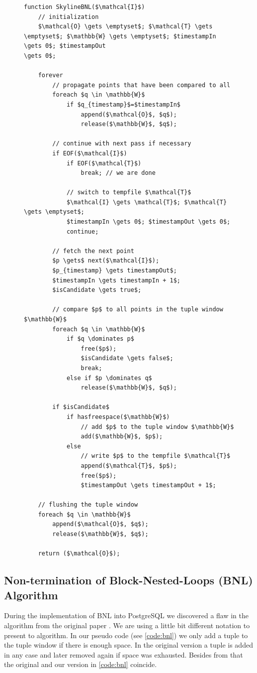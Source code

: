 \begin{figure}[htbp]
\begin{lstlisting}[language=pseudo,
caption={Fixed Block-Nested-Loops (BNL) Algorithm},
label={code:fixedbnl}
]
function SkylineBNL($\mathcal{I}$) 
	// initialization
	$\mathcal{O} \gets \emptyset$; $\mathcal{T} \gets \emptyset$; $\mathbb{W} \gets \emptyset$; $timestampIn \gets 0$; $timestampOut
\gets 0$;

	forever
		// propagate points that have been compared to all
		foreach $q \in \mathbb{W}$
			if $q_{timestamp}$=$timestampIn$
				append($\mathcal{O}$, $q$);
				release($\mathbb{W}$, $q$);

		// continue with next pass if necessary
		if EOF($\mathcal{I}$)
			if EOF($\mathcal{T}$)
				break; // we are done

			// switch to tempfile $\mathcal{T}$
			$\mathcal{I} \gets \mathcal{T}$; $\mathcal{T} \gets \emptyset$;
			$timestampIn \gets 0$; $timestampOut \gets 0$;
			continue;

		// fetch the next point
		$p \gets$ next($\mathcal{I}$);
		$p_{timestamp} \gets timestampOut$;
		$timestampIn \gets timestampIn + 1$;
		$isCandidate \gets true$;

		// compare $p$ to all points in the tuple window $\mathbb{W}$
		foreach $q \in \mathbb{W}$
			if $q \dominates p$
				free($p$);
				$isCandidate \gets false$;
				break;
			else if $p \dominates q$
				release($\mathbb{W}$, $q$);

		if $isCandidate$
			if hasfreespace($\mathbb{W}$)
				// add $p$ to the tuple window $\mathbb{W}$
				add($\mathbb{W}$, $p$);
			else
				// write $p$ to the tempfile $\mathcal{T}$
				append($\mathcal{T}$, $p$);
				free($p$);
				$timestampOut \gets timestampOut + 1$;

	// flushing the tuple window
	foreach $q \in \mathbb{W}$
		append($\mathcal{O}$, $q$);
		release($\mathbb{W}$, $q$);

	return ($\mathcal{O}$);
\end{lstlisting}
\vfill
\end{figure}


\subsection{Non-termination of Block-Nested-Loops (BNL) Algorithm}
During the implementation of BNL into PostgreSQL we discovered a flaw in
the algorithm from the original paper \citep{Borzsonyi2001}.  
We are using a little bit different notation to present to algorithm.
In our pseudo code (see \autoref{code:bnl}) we only add a tuple to the
tuple window if there is enough space.  
%
In the original version a tuple is added in any case and later removed
again if space was exhausted.  
%
Besides from that the original and our version in \autoref{code:bnl}
coincide.

